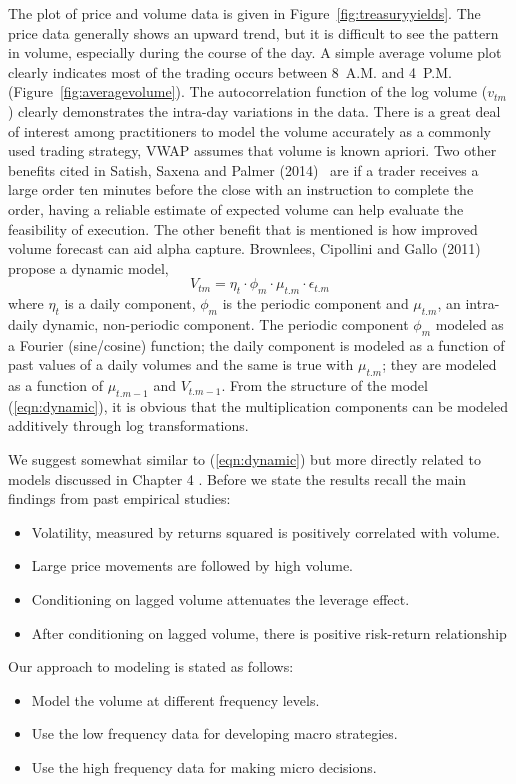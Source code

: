 The plot of price and volume data is given in Figure~\ref{fig:treasuryyields}. The price data generally shows an upward trend, but it is difficult to see the pattern in volume, especially during the course of the day. A simple average volume plot clearly indicates most of the trading occurs between 8~A.M. and 4~P.M. (Figure~\ref{fig:averagevolume}). The autocorrelation function of the log volume ($v_{tm}$) clearly demonstrates the intra-day variations in the data. There is a great deal of interest among practitioners to model the volume accurately as a commonly used trading strategy, VWAP assumes that volume is known apriori. Two other benefits cited in Satish, Saxena and Palmer (2014)~\cite{satish} are if a trader receives a large order ten minutes before the close with an instruction to complete the order, having a reliable estimate of expected volume can help evaluate the feasibility of execution. The other benefit that is mentioned is how improved volume forecast can aid alpha capture. Brownlees, Cipollini and Gallo (2011)~\cite{brownless} propose a dynamic model,
	\begin{equation}\label{eqn:dynamic}
	V_{tm}= \eta_t \cdot \phi_m \cdot \mu_{t.m} \cdot \epsilon_{t.m}
	\end{equation}
where $\eta_t$ is a daily component, $\phi_m$ is the periodic component and $\mu_{t.m}$, an intra-daily dynamic, non-periodic component. The periodic component $\phi_m$ modeled as a Fourier (sine/cosine) function; the daily component is modeled as a function of past values of a daily volumes and the same is true with $\mu_{t.m}$; they are modeled as a function of $\mu_{t.m-1}$ and $V_{t.m-1}$. From the structure of the model (\ref{eqn:dynamic}), it is obvious that the multiplication components can be modeled additively through log transformations.


We suggest somewhat similar to (\ref{eqn:dynamic}) but more directly related to models discussed in Chapter 4 . Before we state the results recall the main findings from past empirical studies:
	\begin{itemize}
	\item Volatility, measured by returns squared is positively correlated with volume.
	\item Large price movements are followed by high volume.
	\item Conditioning on lagged volume attenuates the leverage effect.
	\item After conditioning on lagged volume, there is positive risk-return relationship
	\end{itemize}
Our approach to modeling is stated as follows:
	\begin{itemize}
	\item Model the volume at different frequency levels.
	\item Use the low frequency data for developing macro strategies.
	\item Use the high frequency data for making micro decisions.
	\end{itemize}

